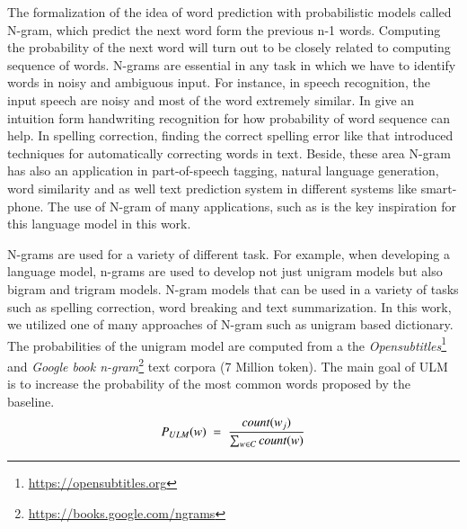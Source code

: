 \documentclass[phd,tocprelim]{cornell}
\begin{document}
The formalization of the idea of word prediction with probabilistic models called N-gram, which predict the next word form the previous n-1 words. Computing the probability of the next word will turn out to be closely related to computing sequence of words. N-grams are essential in any task in which we have to identify words in noisy and ambiguous input. For instance, in speech recognition, the input speech are noisy and most of the word extremely similar. In \cite{shilman2004spatial} give an intuition form handwriting recognition for how probability of word sequence can help. In spelling correction, finding the correct spelling error like \cite{kukich1992techniques} that introduced techniques for automatically correcting words in text. Beside, these area N-gram has also an application in part-of-speech tagging, natural language generation, word similarity and as well text prediction system in different systems like smart-phone. The use of N-gram of many applications, such as \cite{shilman2004spatial,kukich1992techniques} is the key inspiration for this language model in this work.  

N-grams are used for a variety of different task. For example, when developing a language model, n-grams are used to develop not just unigram models but also bigram and trigram models. N-gram models that can be used in a variety of tasks such as spelling correction, word breaking and text summarization. In this work, we utilized one of many approaches of N-gram such as unigram based dictionary. The probabilities of the unigram model are computed from a the {\textit{Opensubtitles}}\footnote{\href{https://opensubtitles.org}{https://opensubtitles.org}} \cite{lison2016opensubtitles2016} and {\textit{Google book n-gram}}\footnote{\href{https://books.google.com/ngrams}{ https://books.google.com/ngrams}} 
 text corpora (7 Million token). The main goal of ULM is to increase the probability of the most common words proposed by the baseline. 
\begin{equation}
\small P_{ULM}(w)\;=\;\frac{count(w_j)}{\sum_{w\in C} count(w)} 
\end{equation}  
\end{document}
